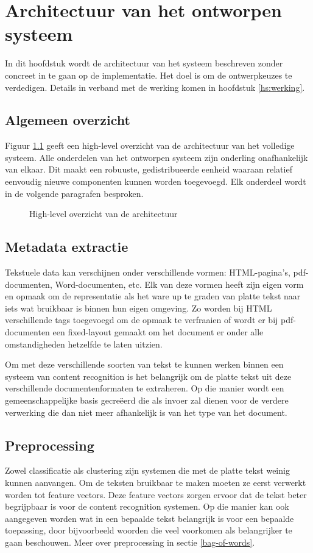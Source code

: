 \chapter{Architectuur van het ontworpen systeem}

In dit hoofdstuk wordt de architectuur van het systeem beschreven zonder concreet in
te gaan op de implementatie. Het doel is om de ontwerpkeuzes te verdedigen. Details in verband met de werking komen in hoofdstuk \ref{hs:werking}. 

\section{Algemeen overzicht}

Figuur \ref{fig:overzicht-architectuur} geeft een high-level overzicht van de architectuur van het volledige systeem. Alle onderdelen van het ontworpen systeem zijn onderling onafhankelijk van elkaar. Dit maakt een robuuste, gedistribueerde eenheid waaraan relatief eenvoudig nieuwe componenten kunnen worden toegevoegd. Elk onderdeel wordt in de volgende paragrafen besproken.

\begin{figure}[h]
	\caption{High-level overzicht van de architectuur}
	\label{fig:overzicht-architectuur}
\end{figure}

\section{Metadata extractie}
Tekstuele data kan verschijnen onder verschillende vormen: HTML-pagina's, pdf-documenten, Word-documenten, etc. Elk van deze vormen heeft zijn eigen vorm en opmaak om de representatie als het ware up te graden van platte tekst naar iets wat bruikbaar is binnen hun eigen omgeving. Zo worden bij HTML verschillende tags toegevoegd om de opmaak te verfraaien of wordt er bij pdf-documenten een fixed-layout gemaakt om het document er onder alle omstandigheden hetzelfde te laten uitzien. 

Om met deze verschillende soorten van tekst te kunnen werken binnen een systeem van content recognition is het belangrijk om de platte tekst uit deze verschillende documentenformaten te extraheren. Op die manier wordt een gemeenschappelijke basis gecre\"eerd die als invoer zal dienen voor de verdere verwerking die dan niet meer afhankelijk is van het type van het document.

\section{Preprocessing}
Zowel classificatie als clustering zijn systemen die met de platte tekst weinig kunnen aanvangen. Om de teksten bruikbaar te maken moeten ze eerst verwerkt worden tot feature vectors. Deze feature vectors zorgen ervoor dat de tekst beter begrijpbaar is voor de content recognition systemen. Op die manier kan ook aangegeven worden wat in een bepaalde tekst belangrijk is voor een bepaalde toepassing, door bijvoorbeeld woorden die veel voorkomen als belangrijker te gaan beschouwen. Meer over preprocessing in sectie \ref{bag-of-words}.

